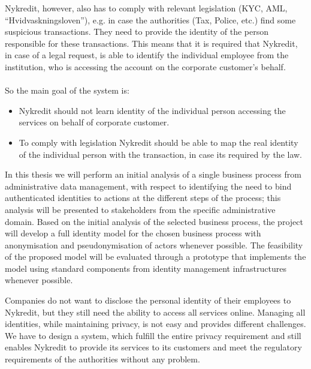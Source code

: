 Nykredit, however, also has to comply with relevant legislation (KYC, AML, “Hvidvaskningsloven”),  e.g. in case the authorities (Tax, Police, etc.) find some suspicious transactions. They need to provide the identity of the person responsible for these transactions.
This means that it is required that Nykredit, in case of a legal request, is able to identify the individual employee from the institution, who is accessing the account on the corporate customer’s behalf.
\\
\\So the main goal of the system is:
\begin{itemize}
	\item Nykredit should not learn identity of the individual person accessing the services on behalf of corporate customer.
	\item To comply with legislation Nykredit should be able to map the real identity of the individual person with the transaction, in case its required by the law.
\end{itemize}
In this thesis we will perform an initial analysis of a single business process from administrative data management, with respect to identifying the need to bind authenticated identities to actions at the different steps of the process; this analysis will be presented to stakeholders from the specific administrative domain. Based on the initial analysis of the selected business process, the project will develop a full identity model for the chosen business process with anonymisation and pseudonymisation of actors whenever possible. The feasibility of the proposed model will be evaluated through a prototype that implements the model using standard components from identity management infrastructures whenever possible.

Companies do not want to disclose the personal identity of their employees to Nykredit, but they still need the ability to access all services online. Managing all identities, while maintaining privacy, is not easy and provides different challenges. We have to design a system, which fulfill the entire privacy requirement and still enables Nykredit to provide its services to its customers and meet the regulatory requirements of the authorities without any problem.
 